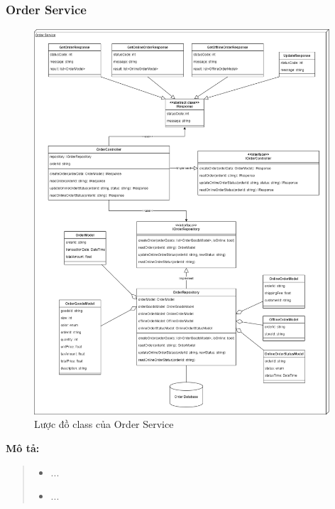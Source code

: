 \subsubsection{Order Service}
\begin{figure}[!htp]
	\centering
	\includegraphics[width=11cm]{img/Architecture/service/OrderService.png}
	\newline
	\caption{Lược đồ class của Order Service}
\end{figure}
\textbf{Mô tả:}
\begin{quote}
	\begin{itemize}
		\item ...
		\item ...
	\end{itemize}
\end{quote}


